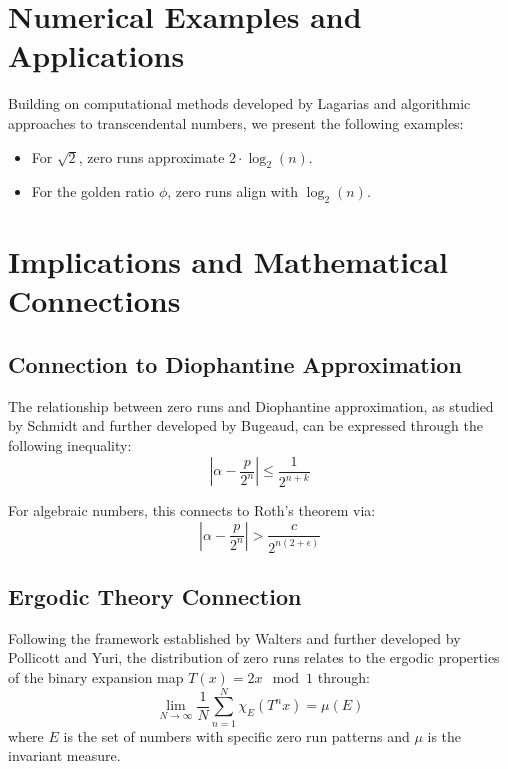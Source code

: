 \section{Numerical Examples and Applications}
Building on computational methods developed by Lagarias and 
algorithmic approaches to transcendental numbers, we present 
the following examples:
\begin{itemize}
    \item For $\sqrt{2}$, zero runs approximate $2 \cdot \log_2(n)$.
    \item For the golden ratio $\phi$, zero runs align with $\log_2(n)$.
\end{itemize}

\section{Implications and Mathematical Connections}

\subsection{Connection to Diophantine Approximation}
The relationship between zero runs and Diophantine approximation, as studied by Schmidt 
and further developed by Bugeaud, can be expressed through the following inequality:
\begin{equation}
    \left|\alpha - \frac{p}{2^n}\right| \leq \frac{1}{2^{n+k}}
\end{equation}

For algebraic numbers, this connects to Roth's theorem via:
\begin{equation}
    \left|\alpha - \frac{p}{2^n}\right| > \frac{c}{2^{n(2+\epsilon)}}
\end{equation}

\subsection{Ergodic Theory Connection}
Following the framework established by Walters and further developed by 
Pollicott and Yuri, the distribution of zero runs relates to the ergodic 
properties of the binary expansion map $T(x) = 2x \mod 1$ through:
\begin{equation}
    \lim_{N \to \infty} \frac{1}{N} \sum_{n=1}^N \chi_E(T^n x) = \mu(E)
\end{equation}
where $E$ is the set of numbers with specific zero run patterns and $\mu$ is the invariant measure.

